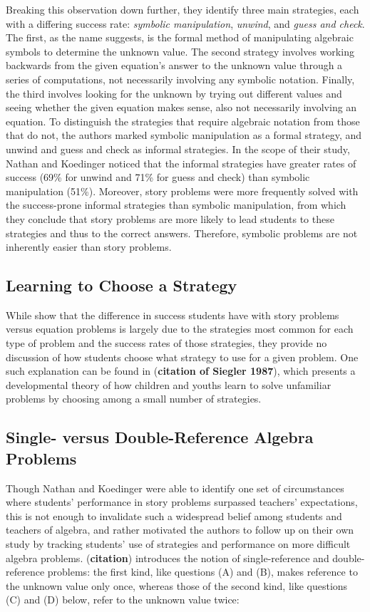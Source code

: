 \documentclass[10pt,letterpaper]{article}
\begin{document}
Breaking this observation down further, they identify three main strategies, each with a differing success rate: \textit{symbolic manipulation}, \textit{unwind}, and \textit{guess and check}. The first, as the name suggests, is the formal method of manipulating algebraic symbols to determine the unknown value. The second strategy involves working backwards from the given equation's answer to the unknown value through a series of computations, not necessarily involving any symbolic notation. Finally, the third involves looking for the unknown by trying out different values and seeing whether the given equation makes sense, also not necessarily involving an equation. To distinguish the strategies that require algebraic notation from those that do not, the authors marked symbolic manipulation as a formal strategy, and unwind and guess and check as informal strategies. In the scope of their study, Nathan and Koedinger noticed that the informal strategies have greater rates of success (69\% for unwind and 71\% for guess and check) than symbolic manipulation (51\%). Moreover, story problems were more frequently solved with the success-prone informal strategies than symbolic manipulation, from which they conclude that story problems are more likely to lead students to these strategies and thus to the correct answers. Therefore, symbolic problems are not inherently easier than story problems.

\subsection{Learning to Choose a Strategy}
While  show that the difference in success students have with story problems versus equation problems is largely due to the strategies most common for each type of problem and the success rates of those strategies, they provide no discussion of how students choose what strategy to use for a given problem. One such explanation can be found in (\textbf{citation of Siegler 1987}), which presents a developmental theory of how children and youths learn to solve unfamiliar problems by choosing among a small number of strategies. 

\subsection{Single- versus Double-Reference Algebra Problems}

Though Nathan and Koedinger were able to identify one set of circumstances where students' performance in story problems surpassed teachers' expectations, this is not enough to invalidate such a widespread belief among students and teachers of algebra, and rather motivated the authors to follow up on their own study by tracking students' use of strategies and performance on more difficult algebra problems. (\textbf{citation}) introduces the notion of single-reference and double-reference problems: the first kind, like questions (A) and (B), makes reference to the unknown value only once, whereas those of the second kind, like questions (C) and (D) below, refer to the unknown value twice:
\end{document}
